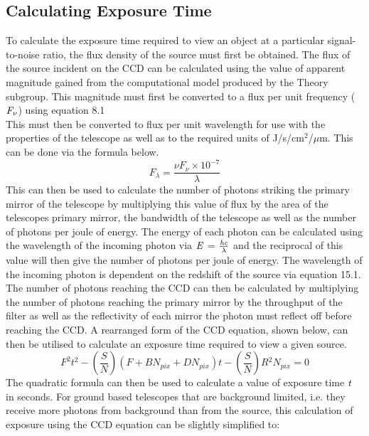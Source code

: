 \documentclass[pdf,color]{UoBnote}
\begin{document}
\subsection{Calculating Exposure Time}
To calculate the exposure time required to view an object at a particular signal-to-noise ratio, the flux density of the source must first be obtained. The flux of the source incident on the CCD can be calculated using the value of apparent magnitude gained from the computational model produced by the Theory subgroup. This magnitude must first be converted to a flux per unit frequency ($\it{F_\nu}$) using equation 8.1\\
\newline
This must then be converted to flux per unit wavelength for use with the properties of the telescope as well as to the required units of J/s/cm$^2$/$\mu$m. This can be done via the formula below.\\
\newline
\begin{equation}
F_\lambda = \frac{\nu F_\nu \times 10^{-7}}{\lambda}
\end{equation}
\newline
This can then be used to calculate the number of photons striking the primary mirror of the telescope by multiplying this value of flux by the area of the telescopes primary mirror, the bandwidth of the telescope as well as the number of photons per joule of energy. The energy of each photon can be calculated using the wavelength of the incoming photon via $\it{E}$ = $\frac{\it{hc}}{\lambda}$ and the reciprocal of this value will then give the number of photons per joule of energy. The wavelength of the incoming photon is dependent on the redshift of the source via equation 15.1. The number of photons reaching the CCD can then be calculated by multiplying the number of photons reaching the primary mirror by the throughput of the filter as well as the reflectivity of each mirror the photon must reflect off before reaching the CCD. A rearranged form of the CCD equation, shown below, can then be utilised to calculate an exposure time required to view a given source.\\
\newline
\begin{equation}
F^2t^2 - (\frac{S}{N})(F + BN_{pix} + DN_{pix})t - (\frac{S}{N})R{^2}N_{pix} = 0
\end{equation}
\newline
The quadratic formula can then be used to calculate a value of exposure time $\it{t}$ in seconds. For ground based telescopes that are background limited, i.e. they receive more photons from background than from the source, this calculation of exposure using the CCD equation can be slightly simplified to:\\
\end{document}
